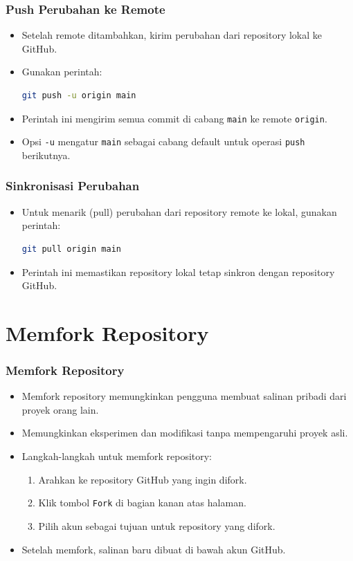 \documentclass[aspectratio=169, table]{beamer}
\begin{document}
	\begin{frame}[fragile]
		\frametitle{Push Perubahan ke Remote}
		\begin{itemize}
			\item Setelah remote ditambahkan, kirim perubahan dari repository lokal ke GitHub.
			\item Gunakan perintah:
			\begin{lstlisting}[language=bash]
				git push -u origin main
			\end{lstlisting}
			\item Perintah ini mengirim semua commit di cabang \texttt{main} ke remote \texttt{origin}.
			\item Opsi \texttt{-u} mengatur \texttt{main} sebagai cabang default untuk operasi \texttt{push} berikutnya.
		\end{itemize}
	\end{frame}
	
	\begin{frame}[fragile]
		\frametitle{Sinkronisasi Perubahan}
		\begin{itemize}
			\item Untuk menarik (pull) perubahan dari repository remote ke lokal, gunakan perintah:
			\begin{lstlisting}[language=bash]
				git pull origin main
			\end{lstlisting}
			\item Perintah ini memastikan repository lokal tetap sinkron dengan repository GitHub.
		\end{itemize}
	\end{frame}
	
	\section{Memfork Repository}
	
	\begin{frame}[fragile]
		\frametitle{Memfork Repository}
		\begin{itemize}
			\item Memfork repository memungkinkan pengguna membuat salinan pribadi dari proyek orang lain.
			\item Memungkinkan eksperimen dan modifikasi tanpa mempengaruhi proyek asli.
			\item Langkah-langkah untuk memfork repository:
			\begin{enumerate}
				\item Arahkan ke repository GitHub yang ingin difork.
				\item Klik tombol \texttt{Fork} di bagian kanan atas halaman.
				\item Pilih akun sebagai tujuan untuk repository yang difork.
			\end{enumerate}
			\item Setelah memfork, salinan baru dibuat di bawah akun GitHub.
		\end{itemize}
	\end{frame}
	
\end{document}
